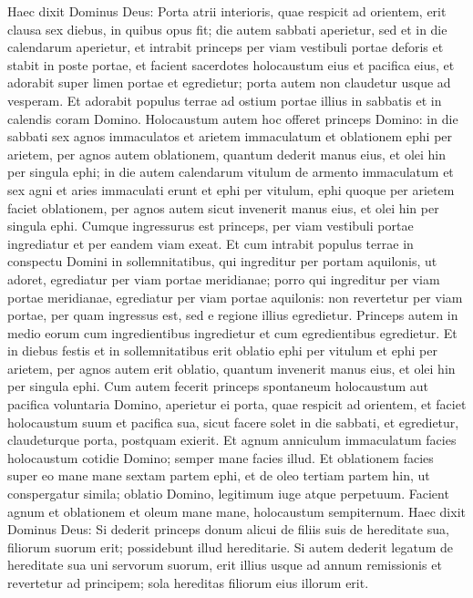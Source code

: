 \begin{biblechapter}  
\verse Haec dixit Dominus Deus: Porta atrii interioris, quae respicit ad orientem, erit clausa sex diebus, in quibus opus fit; die autem sabbati aperietur, sed et in die calendarum aperietur, 
\verse et intrabit princeps per viam vestibuli portae deforis et stabit in poste portae, et facient sacerdotes holocaustum eius et pacifica eius, et adorabit super limen portae et egredietur; porta autem non claudetur usque ad vesperam. 
\verse Et adorabit populus terrae ad ostium portae illius in sabbatis et in calendis coram Domino. 
\verse Holocaustum autem hoc offeret princeps Domino: in die sabbati sex agnos immaculatos et arietem immaculatum 
\verse et oblationem ephi per arietem, per agnos autem oblationem, quantum dederit manus eius, et olei hin per singula ephi; 
\verse in die autem calendarum vitulum de armento immaculatum et sex agni et aries immaculati erunt 
\verse et ephi per vitulum, ephi quoque per arietem faciet oblationem, per agnos autem sicut invenerit manus eius, et olei hin per singula ephi. 
\verse Cumque ingressurus est princeps, per viam vestibuli portae ingrediatur et per eandem viam exeat. 
\verse Et cum intrabit populus terrae in conspectu Domini in sollemnitatibus, qui ingreditur per portam aquilonis, ut adoret, egrediatur per viam portae meridianae; porro qui ingreditur per viam portae meridianae, egrediatur per viam portae aquilonis: non revertetur per viam portae, per quam ingressus est, sed e regione illius egredietur. 
\verse Princeps autem in medio eorum cum ingredientibus ingredietur et cum egredientibus egredietur. 
\verse Et in diebus festis et in sollemnitatibus erit oblatio ephi per vitulum et ephi per arietem, per agnos autem erit oblatio, quantum invenerit manus eius, et olei hin per singula ephi. 
\verse Cum autem fecerit princeps spontaneum holocaustum aut pacifica voluntaria Domino, aperietur ei porta, quae respicit ad orientem, et faciet holocaustum suum et pacifica sua, sicut facere solet in die sabbati, et egredietur, claudeturque porta, postquam exierit. 
\verse Et agnum anniculum immaculatum facies holocaustum cotidie Domino; semper mane facies illud. 
\verse Et oblationem facies super eo mane mane sextam partem ephi, et de oleo tertiam partem hin, ut conspergatur simila; oblatio Domino, legitimum iuge atque perpetuum. 
\verse Facient agnum et oblationem et oleum mane mane, holocaustum sempiternum. 
\verse Haec dixit Dominus Deus: Si dederit princeps donum alicui de filiis suis de hereditate sua, filiorum suorum erit; possidebunt illud hereditarie. 
\verse Si autem dederit legatum de hereditate sua uni servorum suorum, erit illius usque ad annum remissionis et revertetur ad principem; sola hereditas filiorum eius illorum erit. 

\end{biblechapter}
